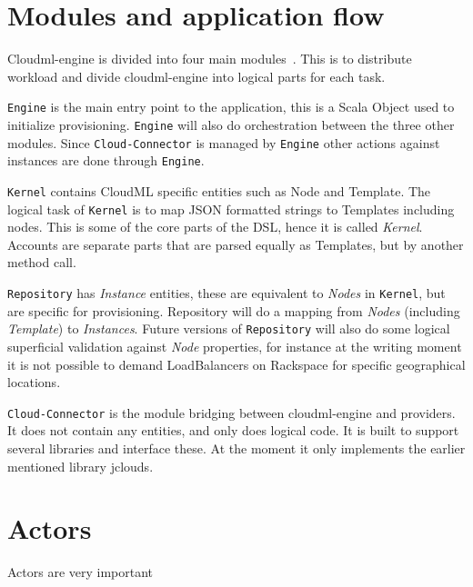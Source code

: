\section{Modules and application flow}

Cloudml-engine is divided into four main modules~.
This is to distribute workload and divide cloudml-engine into logical parts for each task.

\texttt{Engine} is the main entry point to the application, this is a Scala Object used to initialize
provisioning.
\texttt{Engine} will also do orchestration between the three other modules.
Since \texttt{Cloud-Connector} is managed by \texttt{Engine} other actions against 
instances are done through \texttt{Engine}.

\texttt{Kernel} contains CloudML specific entities such as Node and Template.
The logical task of \texttt{Kernel} is to map JSON formatted strings to Templates including nodes.
This is some of the core parts of the DSL, hence it is called \emph{Kernel}.
Accounts are separate parts that are parsed equally as Templates, but by another method call.

\texttt{Repository} has \emph{Instance} entities, these are equivalent to \emph{Nodes} in \texttt{Kernel},
but are specific for provisioning. Repository will do a mapping from \emph{Nodes} (including \emph{Template})
to \emph{Instances}. Future versions of \texttt{Repository} will also do some logical superficial validation
against \emph{Node} properties, for instance at the writing moment it is not possible to 
demand LoadBalancers on Rackspace for specific geographical locations.

\texttt{Cloud-Connector} is the module bridging between cloudml-engine and providers.
It does not contain any entities, and only does logical code. 
It is built to support several libraries and interface these. At the moment it only implements the earlier
mentioned library jclouds.

\section{Actors}

Actors are very important

